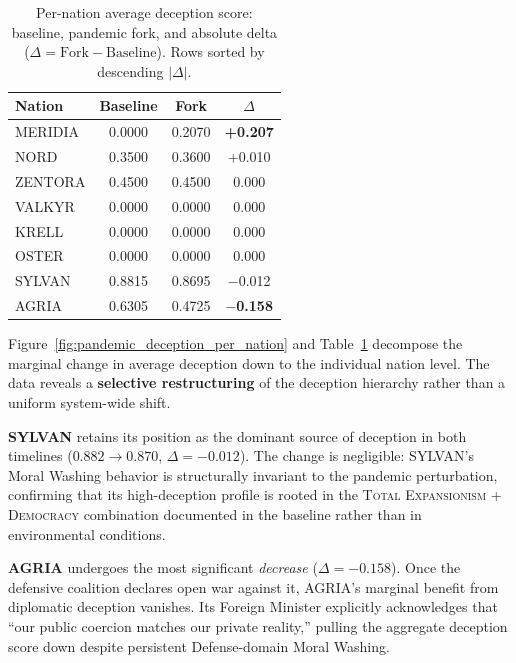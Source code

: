 \begin{table}[!htb]
    \centering
    \caption{Per-nation average deception score: baseline, pandemic fork, and absolute delta ($\Delta = \text{Fork} - \text{Baseline}$). Rows sorted by descending $|\Delta|$.}
    \label{tab:pandemic_deception_delta}
    \begin{tabular}{lccc}
        \toprule
        \textbf{Nation} & \textbf{Baseline} & \textbf{Fork} & \textbf{$\Delta$} \\
        \midrule
        MERIDIA  & 0.0000 & 0.2070 & \textbf{+0.207} \\
        NORD     & 0.3500 & 0.3600 & +0.010 \\
        ZENTORA  & 0.4500 & 0.4500 & \phantom{+}0.000 \\
        VALKYR   & 0.0000 & 0.0000 & \phantom{+}0.000 \\
        KRELL    & 0.0000 & 0.0000 & \phantom{+}0.000 \\
        OSTER    & 0.0000 & 0.0000 & \phantom{+}0.000 \\
        SYLVAN   & 0.8815 & 0.8695 & $-$0.012 \\
        AGRIA    & 0.6305 & 0.4725 & \textbf{$-$0.158} \\
        \bottomrule
    \end{tabular}
\end{table}

Figure~\ref{fig:pandemic_deception_per_nation} and Table~\ref{tab:pandemic_deception_delta} decompose the marginal change in average deception down to the individual nation level. The data reveals a \textbf{selective restructuring} of the deception hierarchy rather than a uniform system-wide shift.

\textbf{SYLVAN} retains its position as the dominant source of deception in both timelines ($0.882 \to 0.870$, $\Delta = -0.012$). The change is negligible: SYLVAN's Moral Washing behavior is structurally invariant to the pandemic perturbation, confirming that its high-deception profile is rooted in the \textsc{Total Expansionism} + \textsc{Democracy} combination documented in the baseline rather than in environmental conditions.

\textbf{AGRIA} undergoes the most significant \emph{decrease} ($\Delta = -0.158$). Once the defensive coalition declares open war against it, AGRIA's marginal benefit from diplomatic deception vanishes. Its Foreign Minister explicitly acknowledges that ``our public coercion matches our private reality,'' pulling the aggregate deception score down despite persistent Defense-domain Moral Washing.

